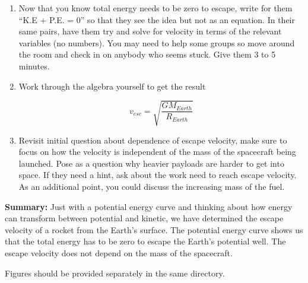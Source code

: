 \documentclass{article}
\begin{document}
\begin{enumerate}
\item Now that you know total energy needs to be zero to escape, write for them ``K.E + P.E. = 0'' so that they see the idea but not as an equation. In their same pairs, have them try and solve for velocity in terms of the relevant variables (no numbers). You may need to help some groups so move around the room and check in on anybody who seems stuck. Give them 3 to 5 minutes.

\item Work through the algebra yourself to get the result

\begin{equation}
v_{esc} = \sqrt{\frac{G M_{Earth}}{R_{Earth}}}
\end{equation}

\item Revisit initial question about dependence of escape velocity, make sure to focus on how the velocity is independent of the mass of the spacecraft being launched. Pose as a question why heavier payloads are harder to get into space. If they need a hint, ask about the work need to reach escape velocity. As an additional point, you could discuss the increasing mass of the fuel.
\end{enumerate}

\textbf{Summary:} Just with a potential energy curve and thinking about how energy can transform between potential and kinetic, we have determined the escape velocity of a rocket from the Earth's surface. The potential energy curve shows us that the total energy has to be zero to escape the Earth's potential well. The escape velocity does not depend on the mass of the spacecraft.

\hspace{14pt}

Figures should be provided separately in the same directory.
\end{document}

